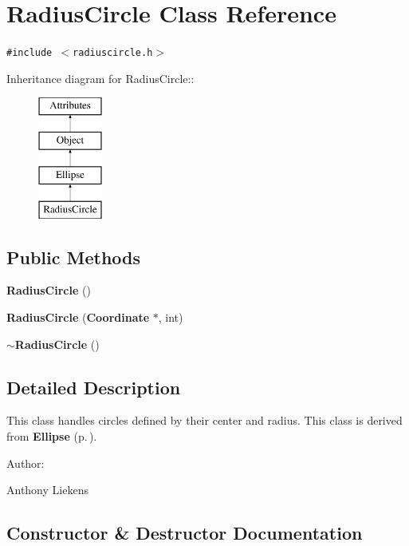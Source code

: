 \section{Radius\-Circle Class Reference}
\label{classRadiusCircle}
{\tt \#include $<$radiuscircle.h$>$}

Inheritance diagram for Radius\-Circle::\begin{figure}[H]
\begin{center}
\leavevmode
\includegraphics[height=4cm]{classRadiusCircle}
\end{center}
\end{figure}
\subsection*{Public Methods}
\begin{CompactItemize}
\item 
{\bf Radius\-Circle} ()
\item 
{\bf Radius\-Circle} ({\bf Coordinate} $\ast$, int)
\item 
{\bf $\sim$Radius\-Circle} ()
\end{CompactItemize}


\subsection{Detailed Description}
This class handles circles defined by their center and radius. This class is derived from {\bf Ellipse} {\rm (p.\,\pageref{classEllipse})}. \begin{Desc}
\item[Author: ]\par
Anthony Liekens \end{Desc}




\subsection{Constructor \& Destructor Documentation}
